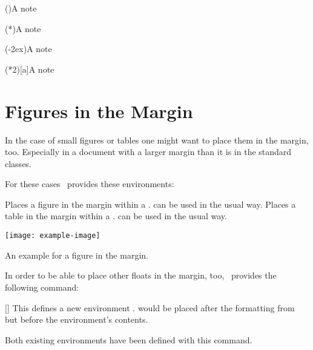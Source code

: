 \documentclass[load-preamble+]{cnltx-doc}
\begin{document}
\begin{sourcecode}
 
 
  \sidenote(){A note}
 
  \sidenote(*){A note}
 
  \sidenote(-2ex){A note}
 
  \sidenote(*2)[a]{A note}
\end{sourcecode}

\section{Figures in the Margin}\label{sec:figures-margin}
In the case of small figures or tables one might want to place them in the
margin, too.  Especially in a document with a larger margin than it is in the
standard classes.

For these cases \snotez\ provides these environments:
\begin{environments}
    Places a figure in the margin within a .   can
    be used in the usual way.
    Places a table in the margin within a .   can
    be used in the usual way.
\end{environments}
\begin{sidefigure}
  \texttt{[image: example-image]}
  \caption{An example for a figure in the margin.}
\end{sidefigure}

In order to be able to place other floats in the margin, too, \snotez\
provides the following command:
\begin{commands}
  []
    This defines a new environment .   would
    be placed after the formatting from \option{sidefloat-format} but before
    the environment's contents.
\end{commands}
Both existing environments have been defined with this command.
\begin{sourcecode}
\end{sourcecode}
\end{document}
